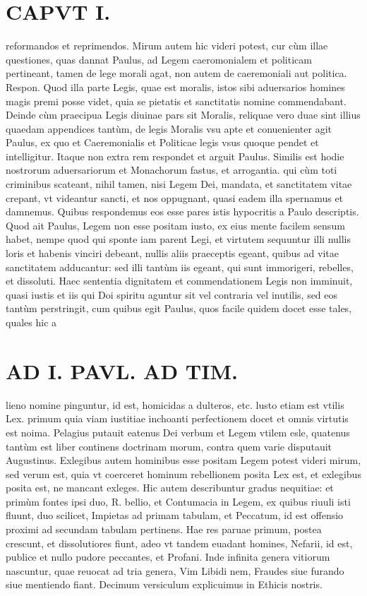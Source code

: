 \documentclass{article}
\begin{document}
\begin{pages}
\section*{CAPVT  I. }
\marginpar{[ p.21 ]}\pstart reformandos et reprimendos. Mirum autem hic videri potest, cur cùm illae questiones, quas dannat Paulus, ad Legem caeromonialem et politicam pertineant, tamen de lege morali agat, non autem de caeremoniali aut politica. Respon. Quod illa parte Legis, quae est moralis, istos sibi aduersarios homines magis premi posse videt, quia se pietatis et sanctitatis nomine commendabant. Deinde cùm praecipua Legis diuinae pars sit Moralis, reliquae vero duae sint illius quaedam appendices tantùm, de legis Moralis vsu apte et conuenienter agit Paulus, ex quo et Caeremonialis et Politicae legis vsus quoque pendet et intelligitur. Itaque non extra rem respondet et arguit Paulus. Similis est hodie nostrorum aduersariorum et Monachorum fastus, et arrogantia. qui cùm toti criminibus scateant, nihil tamen, nisi Legem Dei, mandata, et sanctitatem vitae crepant, vt videantur sancti, et nos oppugnant, quasi eadem illa spernamus et damnemus. Quibus respondemus eos esse pares istis hypocritis a Paulo descriptis. Quod ait Paulus, Legem non esse positam iusto, ex eius mente facilem sensum habet, nempe quod qui sponte iam parent Legi, et virtutem sequuntur illi nullis loris et habenis vinciri debeant, nullis aliis praeceptis egeant, quibus ad vitae sanctitatem adducantur: sed illi tantùm iis egeant, qui sunt immorigeri, rebelles, et dissoluti. Haec sententia dignitatem et commendationem Legis non imminuit, quasi iustis et iis qui Doi spiritu aguntur sit vel contraria vel inutilis, sed eos tantùm perstringit, cum quibus egit Paulus, quos facile quidem docet esse tales, quales hic a\pend
\section*{AD I. PAVL. AD TIM. }
\marginpar{[ p.22 ]}\pstart lieno nomine pinguntur, id est, homicidas a dulteros, etc. lusto etiam est vtilis Lex. primum quia viam iustitiae inchoanti perfectionem docet et omnis virtutis est noima. Pelagius putauit eatenus Dei verbum et Legem vtilem esle, quatenus tantùm est liber continens doctrinam morum, contra quem varie disputauit Augustinus.  \pend\pstart Exlegibus autem hominibus esse positam Legem potest videri mirum, sed verum est, quia vt coerceret hominum rebellionem posita Lex est, et exlegibus posita est, ne mancant exleges.  \pend\pstart Hic autem describuntur gradus nequitiae: et primùm fontes ipsi duo, R. bellio, et Contumacia in Legem, ex quibus riuuli isti fluunt, duo scilicet, Impietas ad primam tabulam, et Peccatum, id est offensio proximi ad secundam tabulam pertinens. Hae res paruae primum, postea crescunt, et dissolutiores fiunt, adeo vt tandem euadant homines, Nefarii, id est, publice et nullo pudore peccantes, et Profani. Inde infinita genera vitiorum nascuntur, quae reuocat ad tria genera, Vim Libidi nem, Fraudes siue furando siue mentiendo fiant. Decimum versiculum explicuimus in Ethicis nostris.  \pend
{}
{}

\end{pages}
\end{document}
